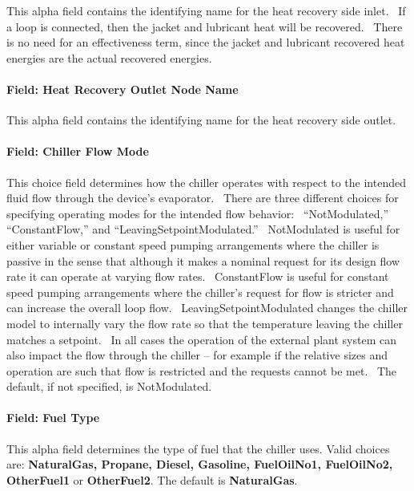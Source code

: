 This alpha field contains the identifying name for the heat recovery side inlet.~ If a loop is connected, then the jacket and lubricant heat will be recovered.~ There is no need for an effectiveness term, since the jacket and lubricant recovered heat energies are the actual recovered energies.

\paragraph{Field: Heat Recovery Outlet Node Name}\label{field-heat-recovery-outlet-node-name-4}

This alpha field contains the identifying name for the heat recovery side outlet.

\paragraph{Field: Chiller Flow Mode}\label{field-chiller-flow-mode-6}

This choice field determines how the chiller operates with respect to the intended fluid flow through the device's evaporator.~ There are three different choices for specifying operating modes for the intended flow behavior:~ ``NotModulated,'' ``ConstantFlow,'' and ``LeavingSetpointModulated.''~ NotModulated is useful for either variable or constant speed pumping arrangements where the chiller is passive in the sense that although it makes a nominal request for its design flow rate it can operate at varying flow rates.~ ConstantFlow is useful for constant speed pumping arrangements where the chiller's request for flow is stricter and can increase the overall loop flow.~ LeavingSetpointModulated changes the chiller model to internally vary the flow rate so that the temperature leaving the chiller matches a setpoint.~ In all cases the operation of the external plant system can also impact the flow through the chiller -- for example if the relative sizes and operation are such that flow is restricted and the requests cannot be met.~ The default, if not specified, is NotModulated.

\paragraph{Field: Fuel Type}\label{field-fuel-type-1-002}

This alpha field determines the type of fuel that the chiller uses. Valid choices are: \textbf{NaturalGas, Propane, Diesel, Gasoline, FuelOilNo1, FuelOilNo2, OtherFuel1} or \textbf{OtherFuel2}. The default is \textbf{NaturalGas}.

